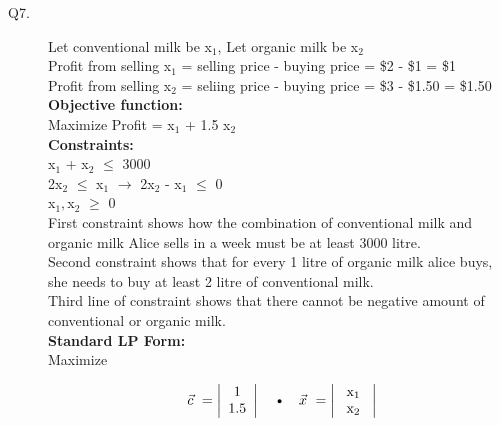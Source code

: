 \documentclass[10pt]{csc_assignment}
\begin{document}
\begin{description}


\newpage
\item[Q7.]

Let conventional milk be  x$_{1}$, Let organic milk be  x$_{2}$\\
Profit from selling  x$_{1}$ = selling price - buying price = \$2 - \$1 = \$1\\
Profit from selling  x$_{2}$ = seliing price - buying price = \$3 - \$1.50 = \$1.50\\

\textbf{Objective function:}\\
Maximize Profit =  x$_{1}$ + 1.5 x$_{2}$\\

\textbf{Constraints:}\\
x$_{1}$ +  x$_{2}$  $\leqslant$ 3000\\
2x$_{2}$  $\leqslant$ x$_{1}$    $\rightarrow$     2x$_{2}$ - x$_{1}$  $\leqslant$ 0\\
x$_{1}, $x$_{2}$ $\geqslant$ 0\\

First constraint shows how the combination of conventional milk and organic milk Alice sells in a week must be at least 3000 litre.\\
Second constraint shows that for every 1 litre of organic milk alice buys, she needs to buy at least 2 litre of conventional milk. \\
Third line of constraint shows that there cannot be negative amount of conventional or organic milk.\\

\textbf{Standard LP Form:}\\
Maximize

\[ \text{ $\vec{c}$ }= \left| \begin{array}{c}
1 \\
1.5 \end{array} \right| 
\text{~~~\textbullet ~~~} \text{$\vec{x}$ } = \left| \begin{array}{c}
\text{ x$_{1}$ } \\
\text{ x$_{2}$ } \end{array} \right| \] 


\end{description}
\end{document}
